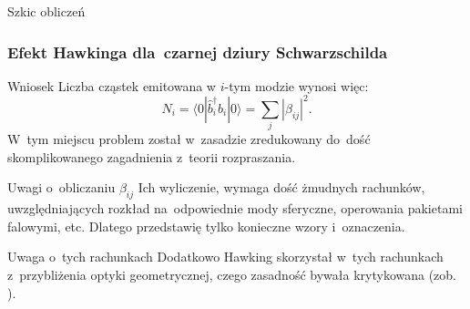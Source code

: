 \documentclass{beamer}  %
\begin{document}
\begin{frame}{Szkic obliczeń}
  \frametitle{Efekt Hawkinga dla~czarnej dziury Schwarzschilda}

  \begin{block}{Wniosek}
    Liczba cząstek emitowana w $i$-tym modzie wynosi więc:
    \begin{equation}
      \label{eq:HawkingPromieniowanie-23}
      N_{ i } = \langle 0 | \widehat{ b }^{ \dagger }_{ i } \widehat{ b }_{ i }
      | 0 \rangle
      = \sum_{ j } | \beta_{ i j } |^{ 2 }.
    \end{equation}
    W~tym miejscu problem został w~zasadzie zredukowany do~dość
    skomplikowanego zagadnienia z~teorii rozpraszania.
  \end{block}

  \begin{block}{Uwagi o~obliczaniu $\beta_{ i j }$}
    Ich wyliczenie, wymaga dość żmudnych rachunków, uwzględniających
    rozkład na~odpowiednie mody sferyczne, operowania pakietami
    falowymi, etc. Dlatego przedstawię tylko konieczne wzory
    i~oznaczenia.
  \end{block}

  \begin{block}{Uwaga o~tych rachunkach}
    Dodatkowo Hawking skorzystał w~tych rachunkach z~przybliżenia
    optyki geometrycznej, czego zasadność bywała krytykowana (zob.
    \cite{FredenhagenHaagDerivationOfHawkingRadiation1990}).
  \end{block}

\end{frame}
\end{document}
